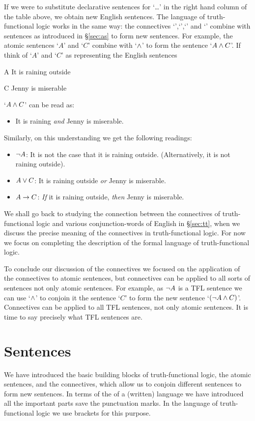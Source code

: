 If we were to substitute declarative sentences for `\dots' in the right hand column of the table above, we obtain new English sentences. The language of truth-functional logic works in the same way: the connectives `\enot',`\eand',`\eor' and `\eif' combine with sentences as introduced in \S\ref{sec:as} to form new sentences. For example, the atomic sentences `$A$' and `$C$' combine
with `$\mathbin{\wedge}$' to form the sentence `$A\mathbin{\wedge} C$'. If think of `$A$' and `$C$' as representing the English sentences
\begin{ekey}
		\item[A] It is raining outside
		\item[C] Jenny is miserable
	\end{ekey}
`$A\mathbin{\wedge} C$' can be read as:
\begin{itemize}
\item It is raining \emph{and} Jenny is miserable.
\end{itemize}
Similarly, on this understanding we get the following readings:
\begin{itemize}
\item $\neg A$: It is not the case that it is raining outside. (Alternatively, it is not raining outside).
\item $A\vee C$: It is raining outside \emph{or} Jenny is miserable.
\item $A\rightarrow C$: \emph{If} it is raining outside, \emph{then} Jenny is miserable.
 \end{itemize}
 We shall go back to studying the connection between the connectives of truth-functional logic and various conjunction-words of English in \S\ref{sec:tt}, when we discuss the precise meaning of the connectives in truth-functional logic. For now we focus on completing the description of the formal language of truth-functional logic.

 To conclude our discussion of the connectives we focused on the application of the connectives to atomic sentences, but connectives can be applied to all sorts of sentences not only atomic sentences. For example, as $\neg A$ is a TFL sentence we can use `$\mathbin{\wedge}$' to conjoin it the sentence `$C$' to form the new sentence `$(\neg A\mathbin{\wedge} C)$'. Connectives can be applied to all TFL sentences, not only atomic sentences. It is time to say precisely what TFL sentences are.

\section{Sentences}\label{s:TFLSentences}
We have introduced the basic building blocks of truth-functional logic, the atomic sentences, and the connectives, which allow us to conjoin different sentences to form new sentences. In terms of the  of a (written) language we have introduced all the important parts save the punctuation marks. In the language of truth-functional logic we use brackets for this purpose.

